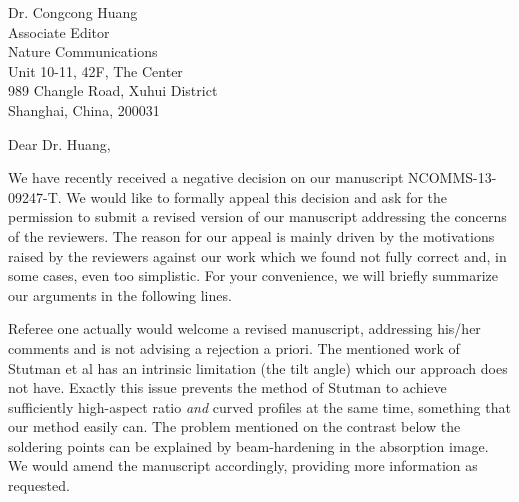 \documentclass[a4paper,english]{scrlttr2}
\begin{document}
\begin{letter}{Dr. Congcong Huang\\

Associate Editor\\
Nature Communications \\

Unit 10-11, 42F, The Center\\
989 Changle Road, Xuhui District\\
Shanghai, China, 200031}
    \opening{Dear Dr. Huang,}

We have recently received a negative decision on our manuscript NCOMMS-13-09247-T. We would like to formally appeal this decision and ask for the permission to submit a revised version of our manuscript addressing the concerns of the reviewers. The reason for our appeal is mainly driven by the motivations raised by the reviewers against our work which we found not fully correct and, in some cases, even too simplistic. For your convenience, we will briefly summarize our arguments in the following lines.

Referee one actually would welcome a revised manuscript, addressing his/her
comments and is not advising a rejection a priori. The mentioned work of
Stutman et al has an intrinsic limitation (the tilt angle) which our
approach does not have. Exactly this issue prevents the method of Stutman to
achieve sufficiently high-aspect ratio \emph{and} curved profiles at the same time, something that our method easily can. The problem mentioned on the contrast below the soldering points can be explained by beam-hardening in the absorption image. We would amend the manuscript accordingly, providing more information as requested.


\end{letter}
\end{document}
